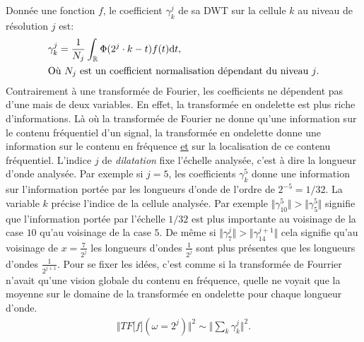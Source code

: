         \begin{definition} Donnée une fonction $f$,
            le coefficient $\gamma_k^j$ de sa DWT sur la cellule $k$ au niveau de résolution $j$ est:
            \begin{align}
                &\gamma_k^j = \frac{1}{N_j} \int_\mathbb{R} \Phi(2^j\cdot k - t)f(t) \text{d} t,\\\notag
                &\text{Où $N_j$ est un coefficient normalisation dépendant du niveau $j$.}
            \end{align}
            Contrairement à une transformée de Fourier, les coefficients ne dépendent pas d'une mais de deux variables. En effet, 
            la transformée en ondelette est plus riche d'informations. Là où la transformée de Fourier ne donne qu'une information 
            sur le contenu fréquentiel d'un signal, la transformée en ondelette donne une information sur le contenu en fréquence \underline{et}
            sur la localisation de ce contenu fréquentiel.
            L'indice $j$ de \textit{dilatation} fixe l'échelle analysée, c'est à dire la longueur d'onde analysée. Par exemple si $j=5$, 
            les coefficients $\gamma^5_k$ donne une information sur l'information portée par les longueurs d'onde de l'ordre de $2^{-5} = 1/32$.
            La variable $k$ précise l'indice de la cellule analysée.
            Par exemple $\Vert \gamma^5_10 \Vert > \Vert \gamma^5_5 \Vert$ signifie que l'information portée par l'échelle $1/32$
            est plus importante au voisinage de la case $10$ qu'au voisinage de la case $5$.
            De même si $\Vert \gamma^j_7 \Vert > \Vert \gamma^{j+1}_{14} \Vert$ cela signifie qu'au voisinage de $x=\frac{7}{2^j}$
            les longueurs d'ondes $\frac{1}{2^j}$ sont plus présentes que les longueurs d'ondes $\frac{1}{2^{j+1}}.$
            Pour se fixer les idées, c'est comme si la transformée de Fourrier n'avait qu'une vision globale du contenu en fréquence, 
            quelle ne voyait que la moyenne sur le domaine de la transformée en ondelette pour chaque longueur d'onde.
            \begin{align}
                \Vert TF\bigl[ f \bigr](\omega = 2^j) \Vert^2 \sim \Vert \sum_{k} \gamma^j_k \Vert^2.
            \end{align}
        \end{definition}


